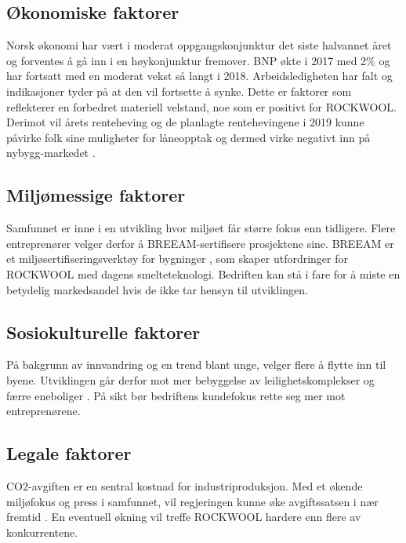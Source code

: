 \subsection{Økonomiske faktorer}
Norsk økonomi har vært i moderat oppgangskonjunktur det siste halvannet året og forventes å gå inn i en høykonjunktur fremover. BNP økte i 2017 med 2\% og har fortsatt med en moderat vekst så langt i 2018. Arbeidsledigheten har falt og indikasjoner tyder på at den vil fortsette å synke. Dette er faktorer som reflekterer en forbedret materiell velstand, noe som er positivt for ROCKWOOL. Derimot vil årets renteheving og de planlagte rentehevingene i 2019 kunne påvirke folk sine muligheter for låneopptak og dermed virke negativt inn på nybygg-markedet \cite{SSB nasjonalregnskap}.

\subsection{Miljømessige faktorer}
Samfunnet er inne i en utvikling hvor miljøet får større fokus enn tidligere. Flere entreprenører velger derfor å BREEAM-sertifisere prosjektene sine. BREEAM er et miljøsertifiseringsverktøy for bygninger \cite{BREEAM}, som skaper utfordringer for ROCKWOOL med dagens smelteteknologi. Bedriften kan stå i fare for å miste en betydelig markedsandel hvis de ikke tar hensyn til utviklingen.

\subsection{Sosiokulturelle faktorer} 
På bakgrunn av innvandring og en trend blant unge, velger flere å flytte inn til byene. Utviklingen går derfor mot mer bebyggelse av leilighetskomplekser og færre eneboliger \cite{Urbanisering}. På sikt bør bedriftens kundefokus rette seg mer mot entreprenørene.

\subsection{Legale faktorer}
CO2-avgiften \cite{Finansdepartementet2018} er en sentral kostnad for industriproduksjon. Med et økende miljøfokus og press i samfunnet, vil regjeringen kunne øke avgiftssatsen i nær fremtid \cite{DagbladetCO2}. En eventuell økning vil treffe ROCKWOOL hardere enn flere av konkurrentene.





